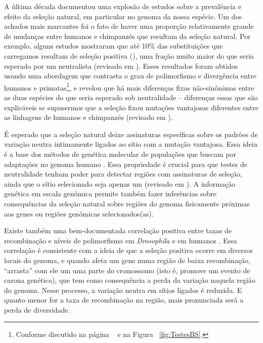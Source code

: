 \begin{refsection}
A última década documentou uma explosão de estudos sobre a prevalência e efeito da seleção natural, em particular no genoma da nossa espécie. Um dos achados mais marcantes foi o fato de haver uma proporção relativamente grande de mudanças entre humanos e chimpanzés que resultam da seleção natural. Por exemplo, alguns estudos mostraram que até 10\% das substituições que carregamos resultam de seleção positiva (\cite{Bustamante2005,Fay2001}), uma fração muito maior do que seria esperado por um neutralista (revisado em \cite{Eyre-Walker2006}). Esses resultados foram obtidos usando uma abordagem que contrasta o grau de polimorfismo e divergência entre humanos e primatas\footnote{Conforme discutido na página ~\pageref{topico:poldiv} e na Figura ~\ref{fig:TestesBS}.}, e revelou que há mais diferenças fixas não-sinônimas entre as duas espécies do que seria esperado sob neutralidade -- diferenças essas que são explicáveis se supusermos que a seleção fixou mutações vantajosas diferentes entre as linhagens de humanos e chimpanzés (revisado em \cite{Eyre-Walker2006}).

É esperado que a seleção natural deixe assinaturas específicas sobre os padrões de variação neutra intimamente ligados ao sítio com a mutação vantajosa. Essa ideia é a base dos métodos de genética molecular de populações que buscam por adaptações no genoma humano \parencite{Kreitman2004}. Essa propriedade é crucial para que testes de neutralidade tenham poder para detectar regiões com assinaturas de seleção, ainda que o sítio selecionado seja apenas um (revisado em \cite{Charlesworth2006}). A informação genética em escala genômica permite também fazer inferências sobre consequências da seleção natural sobre regiões do genoma fisicamente próximas aos genes ou regiões genômicas selecionados(as). 


Existe também uma bem-documentada correlação positiva entre taxas de recombinação e níveis de polimorfismo em \emph{Drosophila} \parencite{Zhang2005} e em humanos \parencite{Hellmann2003}. Essa correlação é consistente com a ideia de que a seleção positiva ocorre em diversos locais do genoma, e quando afeta um gene numa região de baixa recombinação, \enquote{arrasta} com ele um uma parte do cromossomo (isto é, promove um evento de carona genética), que tem como consequência a perda da variação naquela região do genoma. Nesse processo, a variação neutra em sítios ligados é reduzida. E quanto menor for a taxa de recombinação na região, mais pronunciada será a perda de diversidade.


\end{refsection}

